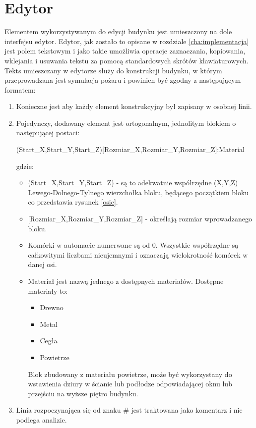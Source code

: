 \section{Edytor}
Elementem wykorzystywanym do edycji budynku jest umieszczony na dole interfejsu edytor.
Edytor, jak zostało to opisane w rozdziale \ref{cha:implementacja} jest polem tekstowym i jako takie umożliwia
 operacje zaznaczania, kopiowania, wklejania i usuwania tekstu za pomocą standardowych skrótów klawiaturowych.
 Tekts umieszczany w edytorze służy do konstrukcji budynku, w którym przeprowadzana jest symulacja pożaru i powinien być zgodny z następującym formatem:
 \begin{enumerate}
 \item Konieczne jest aby każdy element konstrukcyjny był zapisany w osobnej linii.
 \item Pojedynczy, dodawany element jest ortogonalnym, jednolitym blokiem o następującej postaci:
 \begin{center}
	(Start\_X,Start\_Y,Start\_Z)[Rozmiar\_X,Rozmiar\_Y,Rozmiar\_Z]:Material
 \end {center}
 gdzie:
	 \begin{itemize}
	 \item (Start\_X,Start\_Y,Start\_Z) - są to adekwatnie współrzędne (X,Y,Z) Lewego-Dolnego-Tylnego wierzchołka bloku, będącego początkiem bloku co przedstawia rysunek \ref{osie}. 
	 \item $[$Rozmiar\_X,Rozmiar\_Y,Rozmiar\_Z$]$ - określają rozmiar wprowadzanego bloku. 
	 \item Komórki w automacie numerwane są od 0. Wszystkie współrzędne są całkowitymi liczbami nieujemnymi i oznaczają wielokrotność komórek w danej osi.
	 \item Materiał jest nazwą jednego z dostępnych materiałów. Dostępne materiały to:
	 \begin {itemize}
	 \item Drewno
	 \item Metal
	 \item Cegła
	 \item Powietrze
	 \end {itemize}
	 Blok zbudowany z materiału powietrze, może być wykorzystany do wstawienia dziury w ścianie lub podłodze odpowiadającej oknu lub przejściu na wyższe piętro budynku.
	 \end{itemize}
\item Linia rozpoczynająca się od znaku # jest traktowana jako komentarz i nie podlega analizie.
 \end {enumerate}
